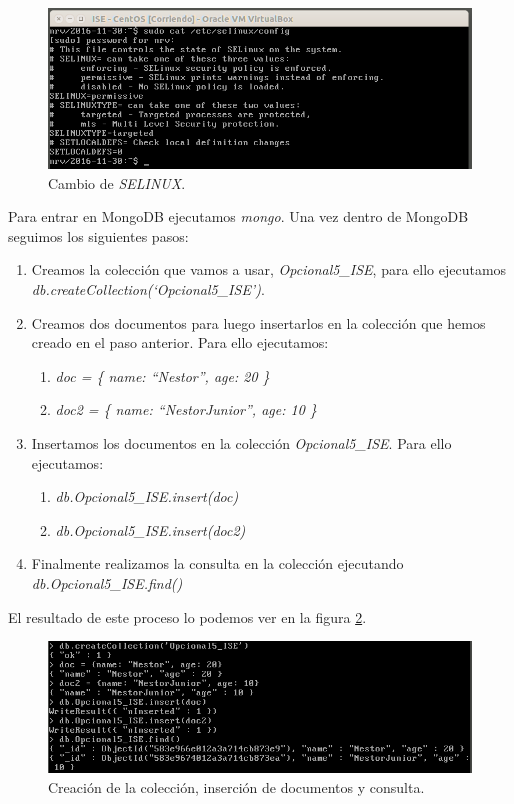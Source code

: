\documentclass[a4paper,titlepage,12pt]{report}	%
\numberwithin{figure}{section} %
\numberwithin{table}{section} %
\begin{document}
	\begin{figure}[H]
		\includegraphics[width=\linewidth]{./Imagenes/P2/O5-2.png}
		\vspace{-0.5cm}
		\caption[Cambio de \textit{SELINUX}.]{Cambio de \textit{SELINUX}.}
		\label{P2-O5-2}
	\end{figure}

	Para entrar en MongoDB ejecutamos \textit{mongo}. Una vez dentro de MongoDB seguimos los siguientes pasos:
	\begin{enumerate}
		\item Creamos la colección que vamos a usar, \textit{Opcional5\_ISE}, para ello ejecutamos \\ \textit{db.createCollection(`Opcional5\_ISE')}.
		\item Creamos dos documentos para luego insertarlos en la colección que hemos creado en el paso anterior. Para ello ejecutamos:
		\begin{enumerate}
			\item \textit{doc = \{ name: ``Nestor'', age: 20 \}}
			\item \textit{doc2 = \{ name: ``NestorJunior'', age: 10 \}}
		\end{enumerate}
		\item Insertamos los documentos en la colección \textit{Opcional5\_ISE}. Para ello ejecutamos:
		\begin{enumerate}
			\item \textit{db.Opcional5\_ISE.insert(doc)}
			\item \textit{db.Opcional5\_ISE.insert(doc2)}
		\end{enumerate}
		\item Finalmente realizamos la consulta en la colección ejecutando \textit{db.Opcional5\_ISE.find()}
	\end{enumerate}

	El resultado de este proceso lo podemos ver en la figura \ref{P2-O5-3}.

	\begin{figure}[H]
		\includegraphics[width=\linewidth]{./Imagenes/P2/O5-3.png}
		\vspace{-0.5cm}
		\caption[Creación de la colección, inserción de documentos y consulta.]{Creación de la colección, inserción de documentos y consulta.}
		\label{P2-O5-3}
	\end{figure}
\end{document}
